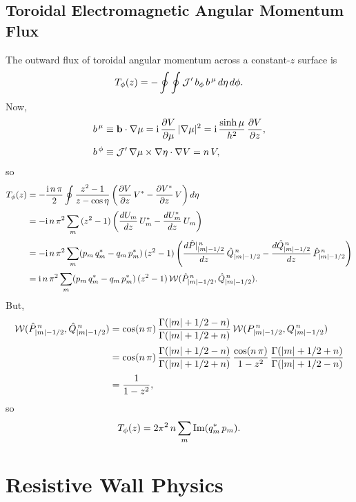 \documentclass[12pt,prb,aps,notitlepage]{revtex4-1}
\begin{document}
\subsection{Toroidal Electromagnetic Angular Momentum Flux}
The outward flux of toroidal angular momentum across a constant-$z$ surface is
\begin{align}
T_\phi(z) = -\oint\oint {\cal J}' \,b_\phi\,b^{\,\mu}\,d\eta\,d\phi.
\end{align}
Now,
\begin{align}
b^{\,\mu} &\equiv {\bf b}\cdot\nabla\mu = {\rm i}\,\frac{\partial V}{\partial \mu}\,|\nabla\mu|^2 = {\rm i}\,\frac{\sinh\mu}{h^2}\,\frac{\partial V}{\partial z},\\[0.5ex]
b^{\,\phi}&\equiv {\cal J}'\,\nabla\mu\times\nabla \eta\cdot\nabla V = n\,V,
\end{align}
so
\begin{align}
T_\phi(z) &= -\frac{{\rm i}\,n\,\pi}{2}\oint \frac{z^2-1}{z-\cos\eta}\left(\frac{\partial V}{\partial z}\,V^\ast -\frac{\partial V^{\ast}}{\partial z}\,V\right)d\eta\nonumber\\[0.5ex]
&= - {\rm i}\,n\,\pi^2\sum_{m}\, (z^2-1)\left(\frac{dU_m}{dz}\,U_{m}^\ast -\frac{dU_m^\ast}{dz}\,U_{m}\right)\nonumber\\[0.5ex]
&= -{\rm i}\,n\,\pi^2\sum_{m}(p_m\,q_m^\ast-q_m\,p_m^{\ast})\,(z^2-1)\left(\frac{d\hat{P}|_{|m|-1/2}^{\,n}}{dz}\,\hat{Q}_{|m|-1/2}^{\,n}- \frac{d\hat{Q}_{|m|-1/2}^{\,n}}{dz}\,\hat{P}_{|m|-1/2}^{\,n}\right)\nonumber\\[0.5ex]
& ={\rm i}\,n\,\pi^2\sum_{m}(p_m\,q_m^\ast-q_m\,p_m^{\ast})\,(z^2-1)\,{\cal W}(\hat{P}_{|m|-1/2}^{\,n},\hat{Q}_{|m|-1/2}^{\,n}).
\end{align}
But,
\begin{align}
{\cal W}(\hat{P}_{|m|-1/2}^{\,n},\hat{Q}_{|m|-1/2}^{\,n})&= 
\cos(n\,\pi) \,\frac{\Gamma(|m|+1/2-n)}{\Gamma(|m|+1/2+n)}\,{\cal W}(P_{|m|-1/2}^{\,n},Q_{|m|-1/2}^{\,n})\nonumber\\[0.5ex]
&= \cos(n\,\pi) \,\frac{\Gamma(|m|+1/2-n)}{\Gamma(|m|+1/2+n)}
\,\frac{\cos(n\,\pi)}{1-z^2}\,\frac{\Gamma(|m|+1/2+n)}{\Gamma(|m|+1/2-n)}\nonumber\\[0.5ex]
&= \frac{1}{1-z^2}, 
\end{align}
so
\begin{equation}
T_\phi(z) = 2\pi^2\,n\sum_m {\rm Im}(q_m^\ast\,p_m).
\end{equation}

\section{Resistive Wall Physics}
\end{document}
